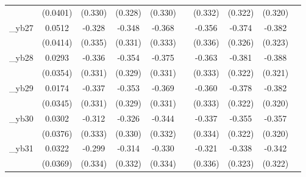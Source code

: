 \begin{table}[htbp]
\begin{tabular}{l*{9}{c}}
            &    (0.0401)         &     (0.330)         &     (0.328)         &     (0.330)         &                     &     (0.332)         &     (0.322)         &     (0.320)         &                     \\
[1em]
\_yb27       &      0.0512         &      -0.328         &      -0.348         &      -0.368         &                     &      -0.356         &      -0.374         &      -0.382         &                     \\
            &    (0.0414)         &     (0.335)         &     (0.331)         &     (0.333)         &                     &     (0.336)         &     (0.326)         &     (0.323)         &                     \\
[1em]
\_yb28       &      0.0293         &      -0.336         &      -0.354         &      -0.375         &                     &      -0.363         &      -0.381         &      -0.388         &                     \\
            &    (0.0354)         &     (0.331)         &     (0.329)         &     (0.331)         &                     &     (0.333)         &     (0.322)         &     (0.321)         &                     \\
[1em]
\_yb29       &      0.0174         &      -0.337         &      -0.353         &      -0.369         &                     &      -0.360         &      -0.378         &      -0.382         &                     \\
            &    (0.0345)         &     (0.331)         &     (0.329)         &     (0.331)         &                     &     (0.333)         &     (0.322)         &     (0.320)         &                     \\
[1em]
\_yb30       &      0.0302         &      -0.312         &      -0.326         &      -0.344         &                     &      -0.337         &      -0.355         &      -0.357         &                     \\
            &    (0.0376)         &     (0.333)         &     (0.330)         &     (0.332)         &                     &     (0.334)         &     (0.322)         &     (0.320)         &                     \\
[1em]
\_yb31       &      0.0322         &      -0.299         &      -0.314         &      -0.330         &                     &      -0.321         &      -0.338         &      -0.342         &                     \\
            &    (0.0369)         &     (0.334)         &     (0.332)         &     (0.334)         &                     &     (0.336)         &     (0.323)         &     (0.322)         &                     \\

\end{tabular}
\end{table}

